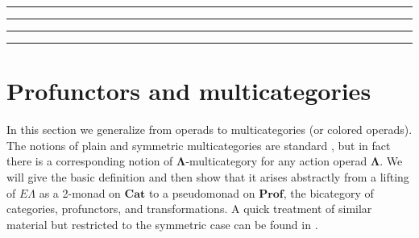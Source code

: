 \documentclass{amsbook} %
\newcommand{\mb}{\mathbf}
\numberwithin{section}{chapter}
\begin{document}
\hrule
\hrule
\hrule
\hrule

\section{Profunctors and multicategories}
In this section we generalize from operads to multicategories (or colored operads).  The notions of plain and symmetric multicategories are standard \cite{bd_hda3}, but in fact there is a corresponding notion of $\mb{\Lambda}$-multicategory for any action operad $\mb{\Lambda}$.  We will give the basic definition and then show that it arises abstractly from a lifting of $E\Lambda$ as a 2-monad  on $\mb{Cat}$ to a pseudomonad on $\mb{Prof}$, the bicategory of categories, profunctors, and transformations.  A quick treatment of similar material but restricted to the symmetric case can be found in \cite{garner_poly}.
\end{document}
